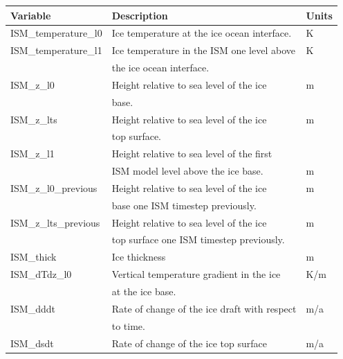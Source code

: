 \documentclass[11pt]{article}
\begin{document}
\begin{table}
  \begin{center}
    \begin{tabular}{ l|l|l }
      Variable              & Description                                  & Units \\
      \hline
      ISM\_temperature\_l0  & Ice temperature at the ice ocean interface.  & K \\
      ISM\_temperature\_l1  & Ice temperature in the ISM one level above   & K \\
                            & the ice ocean interface.                     &   \\ 
      ISM\_z\_l0            & Height relative to sea level of the ice      & m \\
                            & base.                                        &   \\
      ISM\_z\_lts           & Height relative to sea level of the ice      & m \\
                            & top surface.                                 &   \\
      ISM\_z\_l1            & Height relative to sea level of the first    &   \\
                            & ISM model level above the ice base.          & m \\
      ISM\_z\_l0\_previous  & Height relative to sea level of the ice      & m \\
                            & base one ISM timestep previously.            &   \\
      ISM\_z\_lts\_previous & Height relative to sea level of the ice      & m \\
                            & top surface one ISM timestep previously.     &   \\
      ISM\_thick            & Ice thickness                                & m \\
      ISM\_dTdz\_l0         & Vertical temperature gradient in the ice     & K/m \\
                            & at the ice base.                             &   \\
      ISM\_dddt             & Rate of change of the ice draft with respect & m/a \\
                            & to time.                                     &   \\
      ISM\_dsdt             & Rate of change of the ice top surface        & m/a \\

\end{tabular}
\end{center}
\end{table}
\end{document}
